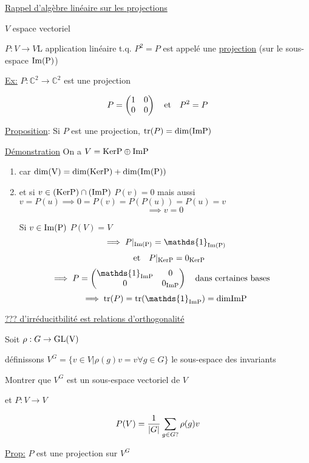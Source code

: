 \underline{Rappel d'algèbre linéaire sur les projections} 

$V$ espace vectoriel

$P: V \to V$L application linéaire t.q. $P^{2} = P$ est appelé une \underline{projection}  (sur le sous-espace $\rm{Im}(P)$)


\underline{Ex:}  $P: \mathds{C}^{2} \to \mathds{C}^{2}$ est une projection


\[ P = \begin{pmatrix} 1 & 0 \\ 0 &0 \end{pmatrix} \qq{et} P^{2}=P  \]


\underline{Proposition}: Si $P$ est une projection, $\tr(P) = \rm{dim}(Im P)$ 

\underline{Démonstration} On a $V = \rm{Ker} P \oplus \rm{Im} P$ 

\begin{enumerate}
	\item car $\rm{dim}(V) = \rm{dim}(\rm{Ker}P) + \rm{dim}(\rm{Im}(P))$
	\item et si $v \in (\rm{Ker}P) \cap (\rm{Im}P)$ $P(v) =0$
		mais aussi $v = P(u) \implies 0 = P(v) = P(P(u)) =P(u) =v$
		\[ \implies v=0 \]
	
		Si $v \in \rm{Im}(P)$ $P(V) = V$
		\[ \implies P|_{\rm{Im}(P)} = \mathds{1}_{\rm{Im}(P)} \]
		\[ \qq{et} P|_{\rm{Ker}P} = 0_{\rm{Ker}P} \]
		\[\implies P = \begin{pmatrix} \mathds{1}_{\rm{Im}P} & 0 \\ 0 & 0_{\rm{Im} P} \end{pmatrix} \qq{dans certaines bases}\]
		\[ \implies \tr(P) = \tr(\mathds{1}_{\rm{Im}P}) = \rm{dim}\rm{Im}P \]
\end{enumerate}


\underline{??? d'irréducitbilité est relations d'orthogonalité} 

Soit $\rho: G \to \rm{GL}(V)$

définissons $V^{G}= \{  v \in V | \rho(g) v = v \forall g \in G \} $ le sous-espace des invariants
\begin{tcolorbox}[title=Exercice]
	
Montrer que $V^G$ est un sous-espace vectoriel de $V$  
\end{tcolorbox}


et  $P:V \to V$

\[ P(V) = \frac{1}{\abs{G}} \sum_{g \in G?}^{} \rho(g) v  \]


\underline{Prop:} $P$ est une projection sur $V^G$ 

